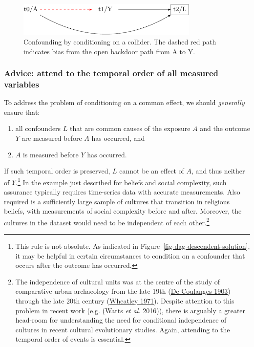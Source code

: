 \documentclass[
  singlecolumn]{article}
\providecommand{\tightlist}{%
  \setlength{\itemsep}{0pt}\setlength{\parskip}{0pt}}\usepackage{longtable,booktabs,array}
\begin{document}
\begin{figure}

{\centering \includegraphics[width=0.8\textwidth,height=\textheight]{causal-dags_files/figure-pdf/fig-dag-common-effect-1.pdf}

}

\caption{\label{fig-dag-common-effect}Confounding by conditioning on a
collider. The dashed red path indicates bias from the open backdoor path
from A to Y.}

\end{figure}

\hypertarget{advice-attend-to-the-temporal-order-of-all-measured-variables-1}{%
\subsubsection{Advice: attend to the temporal order of all measured
variables}\label{advice-attend-to-the-temporal-order-of-all-measured-variables-1}}

To address the problem of conditioning on a common effect, we should
\emph{generally} ensure that:

\begin{enumerate}
\def\labelenumi{\arabic{enumi}.}
\tightlist
\item
  all confounders \(L\) that are common causes of the exposure \(A\) and
  the outcome \(Y\) are measured before \(A\) has occurred, and
\item
  \(A\) is measured before \(Y\) has occurred.
\end{enumerate}

If such temporal order is preserved, \(L\) cannot be an effect of \(A\),
and thus neither of \(Y\).\footnote{This rule is not absolute. As
  indicated in Figure~\ref{fig-dag-descendent-solution}, it may be
  helpful in certain circumstances to condition on a confounder that
  occurs after the outcome has occurred.} In the example just described
for beliefs and social complexity, such assurance typically requires
time-series data with accurate measurements. Also required is a
sufficiently large sample of cultures that transition in religious
beliefs, with measurements of social complexity before and after.
Moreover, the cultures in the dataset would need to be independent of
each other.\footnote{The independence of cultural units was at the
  centre of the study of comparative urban archaeology from the late
  19th (\protect\hyperlink{ref-decoulanges1903}{De Coulanges 1903})
  through the late 20th century
  (\protect\hyperlink{ref-wheatley1971}{Wheatley 1971}). Despite
  attention to this problem in recent work (e.g.
  (\protect\hyperlink{ref-watts2016}{Watts \emph{et al.} 2016})), there
  is arguably a greater head-room for understanding the need for
  conditional independence of cultures in recent cultural evolutionary
  studies. Again, attending to the temporal order of events is
  essential.}
\end{document}
